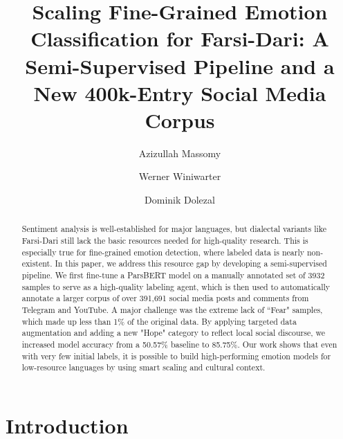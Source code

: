 \documentclass[runningheads]{llncs}
\begin{document}
\title{Scaling Fine-Grained Emotion Classification for Farsi-Dari: A Semi-Supervised Pipeline and a New 400k-Entry Social Media Corpus}
\author{Azizullah Massomy \and Werner Winiwarter\and Dominik Dolezal }

\date{}
\maketitle

\begin{abstract}
 Sentiment analysis is well-established for major languages, but dialectal variants like Farsi-Dari still lack the basic resources needed for high-quality research. This is especially true for fine-grained emotion detection, where labeled data is nearly non-existent. In this paper, we address this resource gap by developing a semi-supervised pipeline. We first fine-tune a ParsBERT model on a manually annotated set of 3932 samples to serve as a high-quality labeling agent, which is then used to automatically annotate a larger corpus of over 391,691 social media posts and comments from Telegram and YouTube. A major challenge was the extreme lack of ``Fear" samples, which made up less than 1\% of the original data. By applying targeted data augmentation and adding a new "Hope" category to reflect local social discourse, we increased model accuracy from a 50.57\% baseline to 85.75\%. Our work shows that even with very few initial labels, it is possible to build high-performing emotion models for low-resource languages by using smart scaling and cultural context.


\end{abstract}
\section{Introduction}
\end{document}

